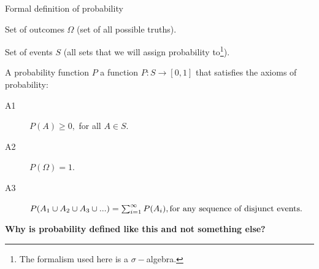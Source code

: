 \begin{frame}{Formal definition of probability}

\begin{small}


\bigskip

Set of outcomes \textbf{$\Omega$} (set of all possible truths).

\smallskip

Set of events \textbf{$S$}  (all sets that we will assign probability to\footnote{The formalism used here is a $\sigma-$algebra.}).

\bigskip

A probability function $P$ a function $P:S \rightarrow [0,1]$ that satisfies the axioms of probability:

\begin{description}
\item[A1] $P(A) \geq 0, $ for all $A \in S$.
\item[A2] $P(\Omega) = 1.$
\item[A3] $P(A_1 \cup A_2 \cup A_3 \cup ...) = \sum_{i=1}^\infty P(A_i), \break \text{for any sequence of disjunct events}.$
\end{description}

\end{small}

\smallskip
\textbf{Why is probability defined like this and not something else?}


\end{frame}



